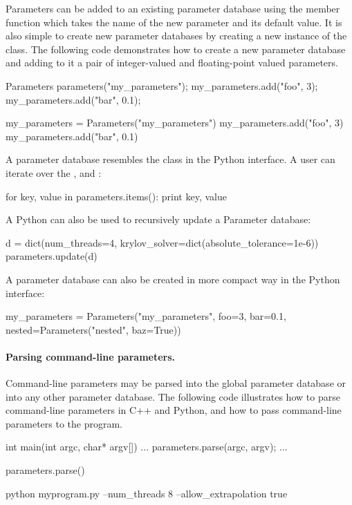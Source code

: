 Parameters can be added to an existing parameter database using the
 member function which takes the name of the new parameter
and its default value. It is also simple to create new parameter
databases by creating a new instance of the 
class. The following code demonstrates how to create a new parameter
database and adding to it a pair of integer-valued and floating-point
valued parameters.
\begin{c++}
Parameters parameters("my_parameters");
my_parameters.add("foo", 3);
my_parameters.add("bar", 0.1);
\end{c++}
\begin{python}
my_parameters = Parameters("my_parameters")
my_parameters.add("foo", 3)
my_parameters.add("bar", 0.1)
\end{python}
A parameter database resembles the  class in the Python
interface. A user can iterate over the ,  and
:
\begin{python}
for key, value in parameters.items():
    print key, value
\end{python}
A Python  can also be used to recursively update a Parameter
database:
\begin{python}
d = dict(num_threads=4, krylov_solver=dict(absolute_tolerance=1e-6))
parameters.update(d)
\end{python}
A parameter database can also be created in more compact way in the
Python interface:
\begin{python}
my_parameters = Parameters("my_parameters", foo=3, bar=0.1,
                           nested=Parameters("nested", baz=True))
\end{python}

\paragraph{Parsing command-line parameters.}

Command-line parameters may be parsed into the global parameter database
or into any other parameter database. The following code illustrates
how to parse command-line parameters in C++ and Python, and how to pass
command-line parameters to the program.
\begin{c++}
int main(int argc, char* argv[])
{
  ...
  parameters.parse(argc, argv);
  ...
}
\end{c++}
\begin{python}
parameters.parse()
\end{python}
\begin{bash}
python myprogram.py --num_threads 8 --allow_extrapolation true
\end{bash}

